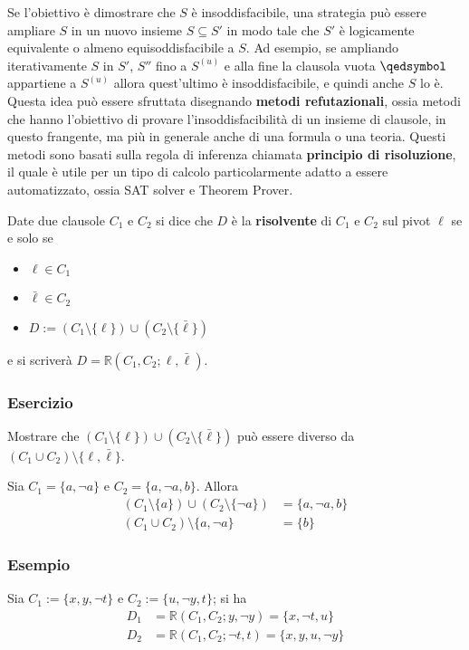 Se l'obiettivo è dimostrare che $S$ è insoddisfacibile, una strategia 
può essere ampliare $S$ in un nuovo insieme $S \subseteq S'$ in modo 
tale che $S'$ è logicamente equivalente o almeno equisoddisfacibile a $S$.
Ad esempio, se ampliando iterativamente $S$ in $S'$, $S''$ fino a $S^{(u)}$ 
e alla fine la clausola vuota $\qedsymbol$ appartiene a $S^{(u)}$ allora quest'ultimo 
è insoddisfacibile, e quindi anche $S$ lo è. Questa idea può essere sfruttata 
disegnando \textbf{metodi refutazionali}, ossia metodi che hanno l'obiettivo di 
provare l'insoddisfacibilità di un insieme di clausole, in questo frangente, 
ma più in generale anche di una formula o una teoria. Questi metodi sono basati 
sulla regola di inferenza chiamata \textbf{principio di risoluzione}, 
il quale è utile per un tipo di calcolo particolarmente adatto a essere automatizzato, 
ossia SAT solver e Theorem Prover. 

\begin{defi}
        Date due clausole $C_1$ e $C_2$ si dice che $D$ è la \textbf{risolvente}
        di $C_1$ e $C_2$ sul pivot $\ell$ se e solo se
        \begin{itemize}
                \item $\ell \in C_1$
                \item $\bar{\ell} \in C_2$
                \item $D := (C_1 \setminus \{\ell\}) \cup (C_2 \setminus \{\bar{\ell}\})$
        \end{itemize}
       e si scriverà $D = \mathbb{R}(C_1,C_2; \ell, \bar{\ell})$. 
\end{defi}

\subsubsection{Esercizio}
Mostrare che $(C_1 \setminus \{\ell\}) \cup (C_2 \setminus \{\bar{\ell}\})$ può essere 
diverso da $(C_1 \cup C_2) \setminus \{\ell, \bar{\ell}\}$.

Sia $C_1 = \{a,\neg a\}$ e $C_2 = \{a, \neg a, b\}$. Allora
\begin{align*}
  (C_1 \setminus \{a\}) \cup (C_2 \setminus \{\neg a\}) & = \{a, \neg a, b\} \\
  (C_1 \cup C_2) \setminus \{a, \neg a\} & = \{b\}
\end{align*}
  

\subsubsection{Esempio}
Sia $C_1 := \{x, y, \neg t\}$ e $C_2 := \{u, \neg y, t\}$; si ha
\begin{align*}
D_1 & = \mathbb{R}(C_1, C_2; y, \neg y) = \{x, \neg t, u\} \\
D_2 & = \mathbb{R}(C_1, C_2; \neg t, t) = \{x, y, u, \neg y\}
\end{align*} 

